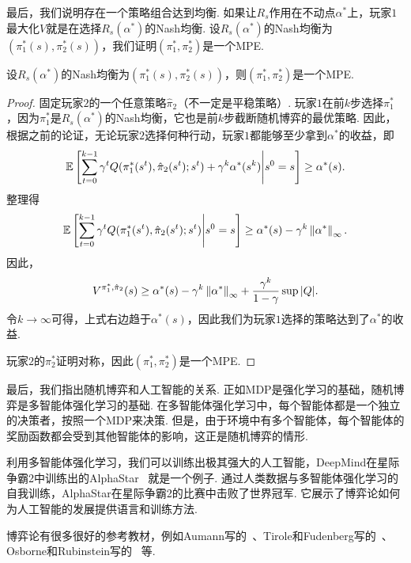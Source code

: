 最后，我们说明存在一个策略组合达到均衡. 如果让$R_s$作用在不动点$\alpha^*$上，玩家$1$最大化$V$就是在选择$R_s(\alpha^*)$的Nash均衡. 设$R_s(\alpha^*)$的Nash均衡为$(\pi_1^*(s),\pi_2^*(s))$，我们证明$(\pi_1^*,\pi_2^*)$是一个MPE. 

\begin{lemma}
    设$R_s(\alpha^*)$的Nash均衡为$(\pi_1^*(s),\pi_2^*(s))$，则$(\pi_1^*,\pi_2^*)$是一个MPE.
\end{lemma}

\begin{proof}
固定玩家$2$的一个任意策略$\hat{\pi}_2$（不一定是平稳策略）. 玩家$1$在前$k$步选择$\pi_1^*$，因为$\pi_1^*$是$R_s(\alpha^*)$的Nash均衡，它也是前$k$步截断随机博弈的最优策略. 因此，根据之前的论证，无论玩家$2$选择何种行动，玩家$1$都能够至少拿到$\alpha^*$的收益，即
\[\mathbb{E}\left[\sum_{t=0}^{k-1}\gamma^tQ(\pi_1^*(s^t),\hat{\pi}_2(s^t);s^t)+\gamma^k\alpha^*(s^k)\middle|s^0=s\right]\ge \alpha^*(s).\]
整理得
\[\mathbb{E}\left[\sum_{t=0}^{k-1}\gamma^tQ(\pi_1^*(s^t),\hat{\pi}_2(s^t);s^t)\middle|s^0=s\right]\ge \alpha^*(s)-\gamma^k\left\|\alpha^*\right\|_\infty.\]
因此，
\[V^{\pi_1^*,\hat{\pi}_2}(s)\ge \alpha^*(s) - \gamma^k\left\|\alpha^*\right\|_\infty + \frac{\gamma^k}{1-\gamma}\sup|Q|.\]
令$k\to\infty$可得，上式右边趋于$\alpha^*(s)$，因此我们为玩家$1$选择的策略达到了$\alpha^*$的收益. 

玩家$2$的$\pi_2^*$证明对称，因此$(\pi_1^*,\pi_2^*)$是一个MPE.
\end{proof}

最后，我们指出随机博弈和人工智能的关系. 正如MDP是强化学习的基础，随机博弈是多智能体强化学习的基础. 在多智能体强化学习中，每个智能体都是一个独立的决策者，按照一个MDP来决策. 但是，由于环境中有多个智能体，每个智能体的奖励函数都会受到其他智能体的影响，这正是随机博弈的情形. 

利用多智能体强化学习，我们可以训练出极其强大的人工智能，DeepMind在星际争霸2中训练出的AlphaStar~\cite{vinyalsGrandmasterLevelStarCraft2019} 就是一个例子. 通过人类数据与多智能体强化学习的自我训练，AlphaStar在星际争霸2的比赛中击败了世界冠军. 它展示了博弈论如何为人工智能的发展提供语言和训练方法. 

\begin{remark}
    博弈论有很多很好的参考教材，例如Aumann写的~\cite{aumannLecturesGameTheory1989}、Tirole和Fudenberg写的~\cite{fudenbergGameTheory1991}、Osborne和Rubinstein写的~\cite{osborneCourseGameTheory1994} 等.
\end{remark}

